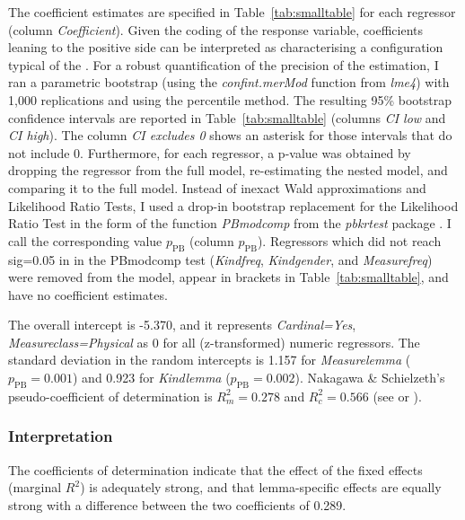 The coefficient estimates are specified in Table~\ref{tab:smalltable} for each regressor (column \textit{Coefficient}).
Given the coding of the response variable, coefficients leaning to the positive side can be interpreted as characterising a configuration typical of the \PGCd.
For a robust quantification of the precision of the estimation, I ran a parametric bootstrap (using the \mbox{\textit{confint.merMod}} function from \textit{lme4}) with 1,000 replications and using the percentile method.
The resulting 95\% bootstrap confidence intervals are reported in Table~\ref{tab:smalltable} (columns \textit{CI low} and \textit{CI high}).
The column \textit{CI excludes 0} shows an asterisk for those intervals that do not include 0.
Furthermore, for each regressor, a p-value was obtained by dropping the regressor from the full model, re-estimating the nested model, and comparing it to the full model.
Instead of inexact Wald approximations and Likelihood Ratio Tests, I used a drop-in bootstrap replacement for the Likelihood Ratio Test in the form of the function \textit{PBmodcomp} from the \textit{pbkrtest} package \citep{HalekohHojsgaard2014}.
I call the corresponding value $p_{\text{PB}}$ (column $p_{\text{PB}}$).
Regressors which did not reach sig=0.05 in in the PBmodcomp test (\textit{Kindfreq}, \textit{Kindgender}, and \textit{Measurefreq}) were removed from the model, appear in brackets in Table~\ref{tab:smalltable}, and have no coefficient estimates.

The overall intercept is -5.370, and it represents \textit{Cardinal=Yes}, \textit{Measureclass=Physical} as 0 for all (z-transformed) numeric regressors.
The standard deviation in the random intercepts is 1.157 for \textit{Measurelemma} ($p_{\text{PB}}=0.001$) and 0.923 for \textit{Kindlemma} ($p_{\text{PB}}=0.002$).
Nakagawa \& Schielzeth's pseudo-coefficient of determination is $R_m^2=0.278$ and $R^2_c=0.566$ (see \citealp{Gries2015} or \citealp{NakagawaSchielzeth2013}).

\subsubsection{Interpretation}

The coefficients of determination indicate that the effect of the fixed effects (marginal $R^2$) is adequately strong, and that lemma-specific effects are equally strong with a difference between the two coefficients of 0.289.


